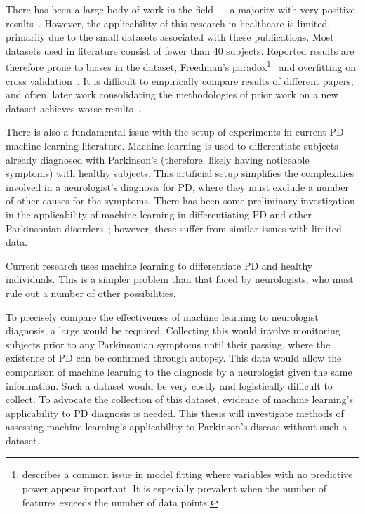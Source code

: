 \documentclass[12pt, twoside]{book}
\renewcommand\emph[1]{\textit{\color{USred}{#1}}}
\begin{document}
There has been a large body of work in the field --- a majority with very positive results~\cite{tsanas2012novel, arora2014high}. However, the applicability of this research in healthcare is limited, primarily due to the small datasets associated with these publications. Most datasets used in literature consist of fewer than 40 subjects. Reported results are therefore prone to biases in the dataset, Freedman's paradox\footnote{\emph{Freedman's paradox} describes a common issue in model fitting where variables with no predictive power appear important. It is especially prevalent when the number of features exceeds the number of data points.}~\cite{freedmanparadox} and overfitting on cross validation~\cite{overfittingcv}. It is difficult to empirically compare results of different papers, and often, later work consolidating the methodologies of prior work on a new dataset achieves worse results~\cite{zhan2016high}.



There is also a fundamental issue with the setup of experiments in current PD machine learning literature. Machine learning is used to differentiate subjects already diagnosed with Parkinson's (therefore, likely having noticeable symptoms) with healthy subjects. This artificial setup simplifies the complexities involved in a neurologist's diagnosis for PD, where they must exclude a number of other causes for the symptoms. There has been some preliminary investigation in the applicability of machine learning in differentiating PD and other Parkinsonian disorders~\cite{esser2011assessment, PDessentialtremordifferentiation}; however, these suffer from similar issues with limited data.

\begin{highlight}
	Current research uses machine learning to differentiate PD and healthy individuals. This is a simpler problem than that faced by neurologists, who must rule out a number of other possibilities.
\end{highlight}

To precisely compare the effectiveness of machine learning to neurologist diagnosis, a large \emph{longitudinal dataset} would be required. Collecting this would involve monitoring subjects prior to any Parkinsonian symptoms until their passing, where the existence of PD can be confirmed through autopsy. This data would allow the comparison of machine learning to the diagnosis by a neurologist given the same information. Such a dataset would be very costly and logistically difficult to collect. To advocate the collection of this dataset, evidence of machine learning's applicability to PD diagnosis is needed. This thesis will investigate methods of assessing machine learning's applicability to Parkinson's disease without such a dataset. 
\end{document}
